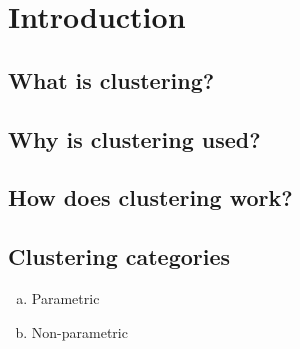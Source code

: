 \section{Introduction}

\subsection{What is clustering?}

\subsection{Why is clustering used?}

\subsection{How does clustering work?}

\subsection{Clustering categories}
\begin{enumerate}[a.]
	\item Parametric
	\item Non-parametric
\end{enumerate}